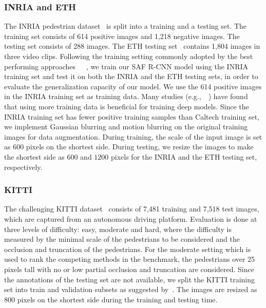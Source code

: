 \documentclass[journal]{IEEEtran}
\begin{document}
\subsubsection{INRIA and ETH}
The INRIA pedestrian dataset~\cite{dalal2005histograms} is split into a training and a testing set. The training set consists of 614 positive images and 1,218 negative images. The testing set consists of 288 images. The ETH testing set~\cite{ess2007depth} contains 1,804 images in three video clips. Following the training setting commonly adopted by the best performing approaches~\cite{ouyang2012discriminative}~\cite{felzenszwalb2010object}~\cite{sermanet2013pedestrian}, we train our SAF R-CNN model using the INRIA training set and test it on both the INRIA and the ETH testing sets, in order to evaluate the generalization capacity of our model. We use the 614 positive images in the INRIA training set as training data. Many studies (e.g.,~\cite{krizhevsky2012imagenet}~\cite{ranzato2007unsupervised}) have found that using more training data is beneficial for training deep models. Since the INRIA training set has fewer positive training samples than Caltech training set, we implement Gaussian blurring and motion blurring on the original training images for data augmentation. During training, the scale of the input image is set as $600$ pixels on the shortest side. During testing, we resize the images to make the shortest side as $600$ and $1200$ pixels for the INRIA and the ETH testing set, respectively.
\subsubsection{KITTI}
The challenging KITTI dataset~\cite{geiger2012we} consists of 7,481 training and 7,518 test images, which are captured from an autonomous driving platform. Evaluation is done at three levels of difficulty: easy, moderate and hard, where the difficulty is measured by the minimal scale of the pedestrians to be considered and the occlusion and truncation of the pedestrians. For the moderate setting which is used to rank the competing methods in the benchmark, the pedestrians over 25 pixels tall with no or low partial occlusion and truncation are considered. Since the annotations of the testing set are not available, we split the KITTI training set into train and validation subsets as suggested by~\cite{chen20153d}. The images are resized as $800$ pixels on the shortest side during the training and testing time.  
\end{document}
